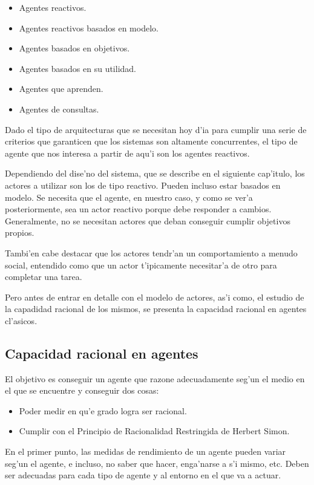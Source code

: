 \documentclass[12pt]{article}
\begin{document}
\begin{itemize}
	\item Agentes reactivos.
	\item Agentes reactivos basados en modelo.
	\item Agentes basados en objetivos.
	\item Agentes basados en su utilidad.
    \item Agentes que aprenden.
    \item Agentes de consultas.
\end{itemize}

Dado el tipo de arquitecturas que se necesitan hoy d'ia para cumplir una serie de criterios que garanticen
que los sistemas son altamente concurrentes, el tipo de agente que nos interesa a partir de aqu'i son los
agentes reactivos.

Dependiendo del dise'no del sistema, que se describe en el siguiente cap'itulo, los actores a utilizar son
los de tipo reactivo. Pueden incluso estar basados en modelo. Se necesita que el agente, en nuestro caso, y como se ver'a
posteriormente, sea un actor reactivo porque debe responder a cambios. Generalmente, no se necesitan actores que deban
conseguir cumplir objetivos propios.

Tambi'en cabe destacar que los actores tendr'an un comportamiento a menudo social, entendido como que un actor t'ipicamente
necesitar'a de otro para completar una tarea.

Pero antes de entrar en detalle con el modelo de actores, as'i como, el estudio de la capadidad racional de los mismos,
se presenta la capacidad racional en agentes cl'asicos.

\subsection{Capacidad racional en agentes}
\label{sub:capacidad racional en agentes}
El objetivo es conseguir un agente que razone adecuadamente seg'un el medio en el que se encuentre y conseguir dos cosas:

\begin{itemize}
	\item Poder medir en qu'e grado logra ser racional.
	\item Cumplir con el Principio de Racionalidad Restringida de Herbert Simon.
\end{itemize}

En el primer punto, las medidas de rendimiento de un agente pueden variar seg'un el agente, e incluso, no saber que hacer,
enga'narse a s'i mismo, etc. Deben ser adecuadas para cada tipo de agente y al entorno en el que va a actuar.
\end{document}
